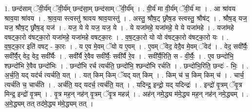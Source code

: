 \documentclass[17pt]{extarticle}
\begin{document}
1. छन्द॑साम् ॅवी॒र्य॑म् ॅवी॒र्य॑म् छन्द॑सा॒म् छन्द॑साम् ॅवी॒र्य᳚म् । . वी॒र्य॑ मा वी॒र्य॑म् ॅवी॒र्य॑ मा । . आ श्रा॑वय श्राव॒या श्रा॑वय । . श्रा॒व॒या स्त्वस्तु॑ श्रावय श्राव॒यास्तु॑ । . अस्तु॒ श्रौष॒ट् छ्रौष॒ड स्त्वस्तु॒ श्रौष॑ट् । . श्रौष॒ड् यज॒ यज॒ श्रौष॒ट् छ्रौष॒ड् यज॑ । . यज॒ ये ये यज॒ यज॒ ये । . ये यजा॑महे॒ यजा॑महे॒ ये ये यजा॑महे । . यजा॑महे वषट्का॒रो व॑षट्का॒रो यजा॑महे॒ यजा॑महे वषट्का॒रः । . व॒ष॒ट्का॒रो यो यो व॑षट्का॒रो व॑षट्का॒रो यः । . व॒ष॒ट्का॒र इति॑ वषट् - का॒रः । . य ए॒व मे॒वम् ॅयो य ए॒वम् । . ए॒वम् ॅवेद॒ वेदै॒व मे॒वम् ॅवेद॑ । . वेद॒ सवी᳚र्यैः॒ सवी᳚र्यै॒र् वेद॒ वेद॒ सवी᳚र्यैः । . सवी᳚र्यै रे॒वैव सवी᳚र्यैः॒ सवी᳚र्यै रे॒व । . सवी᳚र्यै॒रिति॒ स - वी॒र्यैः॒ । . ए॒व छन्दो॑भि॒ श्छन्दो॑भि रे॒वैव छन्दो॑भिः । . छन्दो॑भि रर्च त्यर्चति॒ छन्दो॑भि॒ श्छन्दो॑भि रर्चति । . छन्दो॑भि॒रिति॒ छन्दः॑ - भिः॒ । . अ॒र्च॒ति॒ यद् यद॑र्च त्यर्चति॒ यत् । . यत् किम् किम् ॅयद् यत् किम् । . किम् च॑ च॒ किम् किम् च॑ । . चार्च॒ त्यर्च॑ति च॒ चार्च॑ति । . अर्च॑ति॒ यद् यदर्च॒ त्यर्च॑ति॒ यत् । . यदिन्द्र॒ इन्द्रो॒ यद् यदिन्द्रः॑ । . इन्द्रो॑ वृ॒त्रम् ॅवृ॒त्र मिन्द्र॒ इन्द्रो॑ वृ॒त्रम् । . वृ॒त्र मह॒न् नह॑न् वृ॒त्रम् ॅवृ॒त्र महन्न्॑ । . अह॑न् नमे॒द्ध्य म॑मे॒द्ध्य मह॒न् नह॑न् नमे॒द्ध्यम् । . अ॒मे॒द्ध्यम् तत् तद॑मे॒द्ध्य म॑मे॒द्ध्यम् तत् । \newline
\end{document}
